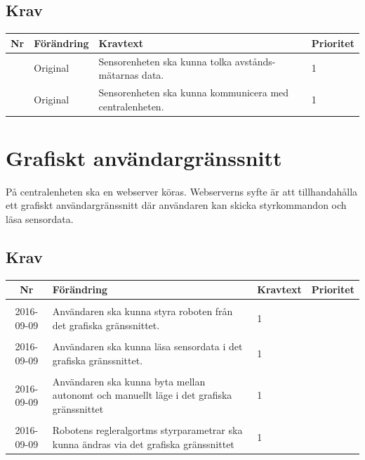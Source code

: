 \documentclass[a4paper,titlepage,12pt]{article}
\newcounter{reqNr}
\newcommand{\nextReqNr}{\stepcounter{reqNr}\arabic{reqNr}}
\newcounter{reqNrII}
\newcommand{\nextReqNrII}{\stepcounter{reqNrII}\arabic{reqNrII}}
\newcommand{\newRequirement}[1] {\pbox{5cm}{Tillagt \\#1}}
\begin{document}
	\subsection{Krav}
	\begin{longtable}[c]{ c l>{\raggedright}p{} l }
		\textbf{Nr} & \textbf{Förändring} & \textbf{Kravtext} & \textbf{Prioritet} 
			\\ \midrule

		\nextReqNr{} & Original & Sensorenheten ska kunna tolka avstånds- mätarnas data. & 1
			\\ \midrule

		\nextReqNr{} & Original & Sensorenheten ska kunna kommunicera med 
			centralenheten. & 1

	\end{longtable}

    \section{Grafiskt användargränssnitt}
    På centralenheten ska en webserver köras. Webserverns syfte är att
    tillhandahålla ett grafiskt användargränssnitt där användaren kan skicka
    styrkommandon och läsa sensordata.
	\subsection{Krav}
	\begin{longtable}[c]{ c l>{\raggedright}p{} l }
		\textbf{Nr} & \textbf{Förändring} & \textbf{Kravtext} & \textbf{Prioritet} 
		\\ \midrule

		\nextReqNrII{} & \newRequirement{2016-09-09} & Användaren ska kunna styra roboten från
								  det grafiska gränssnittet. & 1
		\\ \midrule

		\nextReqNrII{} & \newRequirement{2016-09-09} & Användaren ska kunna läsa sensordata i det grafiska gränssnittet. & 1 \\

		\nextReqNrII{} & \newRequirement{2016-09-09} & Användaren ska kunna byta 
		mellan autonomt och manuellt läge i det grafiska gränssnittet & 1
		\\ \midrule

		\nextReqNrII{} & \newRequirement{2016-09-09} & Robotens regleralgortms styrparametrar
			ska kunna ändras via det grafiska gränssnittet& 1
			\\ \midrule

	\end{longtable}
\end{document}
